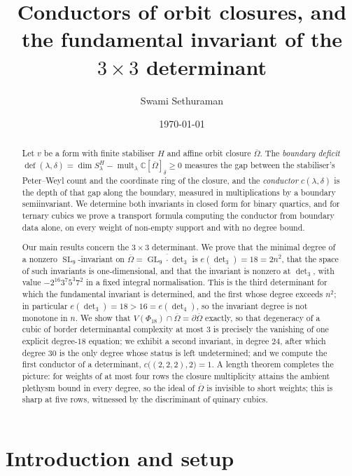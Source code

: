 \documentclass[11pt,reqno]{amsart}
\title[Conductors of orbit closures and the invariant of $\det_3$]
      {Conductors of orbit closures, and the fundamental invariant
       of the $3\times 3$ determinant}
\author{Swami Sethuraman}
\date{\today}
\theoremstyle{plain}
\theoremstyle{definition}
\DeclareMathOperator{\GL}{GL}
\DeclareMathOperator{\SL}{SL}
\DeclareMathOperator{\mult}{mult}
\DeclareMathOperator{\dfc}{def}
\newcommand{\cO}{\overline{\Omega}}
\newcommand{\bC}{\mathbb{C}}
\begin{document}
\begin{abstract}
Let $v$ be a form with finite stabiliser $H$ and affine orbit closure $\cO$.
The \emph{boundary deficit}
$\dfc(\lambda,\delta)=\dim S_\lambda^{H}-\mult_\lambda\bC[\cO]_\delta\ge 0$
measures the gap between the stabiliser's Peter--Weyl count and the coordinate
ring of the closure, and the \emph{conductor} $c(\lambda,\delta)$ is the depth
of that gap along the boundary, measured in multiplications by a boundary
semiinvariant.  We determine both invariants in closed form for binary
quartics, and for ternary cubics we prove a transport formula computing the
conductor from boundary data alone, on every weight of non-empty support and
with no degree bound.

Our main results concern the $3\times3$ determinant.  We prove that the
minimal degree of a nonzero $\SL_9$-invariant on
$\cO=\overline{\GL_9\cdot\det_3}$ is $e(\det_3)=18=2n^{2}$, that the space of
such invariants is one-dimensional, and that the invariant is nonzero at
$\det_3$, with value $-2^{16}3^{7}5^{3}7^{2}$ in a fixed integral
normalisation.  This is the third determinant for which the fundamental
invariant is determined, and the first whose degree exceeds $n^{2}$; in
particular $e(\det_3)=18>16=e(\det_4)$, so the invariant degree is not
monotone in $n$.  We show that $V(\Phi_{18})\cap\cO=\partial\cO$ exactly, so
that degeneracy of a cubic of border determinantal complexity at most $3$ is
precisely the vanishing of one explicit degree-$18$ equation; we exhibit a
second invariant, in degree $24$, after which degree $30$ is the only degree
whose status is left undetermined; and we compute the first conductor of a
determinant, $c\big((2,2,2),2\big)=1$.  A length theorem completes the picture:
for weights of at most four rows the closure multiplicity attains the ambient
plethysm bound in every degree, so the ideal of $\cO$ is invisible to short
weights; this is sharp at five rows, witnessed by the discriminant of quinary
cubics.
\end{abstract}

\maketitle

\section{Introduction and setup}\label{sec:setup}
\end{document}
